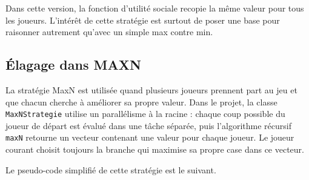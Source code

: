 \documentclass[11pt,a4paper]{article}
\begin{document}
Dans cette version, la fonction d'utilité sociale recopie la même valeur pour tous les joueurs. L'intérêt de cette stratégie est surtout de poser une base pour raisonner autrement qu'avec un simple max contre min.

\subsection{Élagage dans MAXN}

La stratégie MaxN est utilisée quand plusieurs joueurs prennent part au jeu et que chacun cherche à améliorer sa propre valeur. Dans le projet, la classe \texttt{MaxNStrategie} utilise un parallélisme à la racine : chaque coup possible du joueur de départ est évalué dans une tâche séparée, puis l'algorithme récursif \texttt{maxN} retourne un vecteur contenant une valeur pour chaque joueur. Le joueur courant choisit toujours la branche qui maximise sa propre case dans ce vecteur.

Le pseudo-code simplifié de cette stratégie est le suivant.

\begin{algorithm}[H]
\DontPrintSemicolon
{}

\caption{Algorithme MaxN pour $n$ joueurs}
\end{algorithm}
\end{document}
